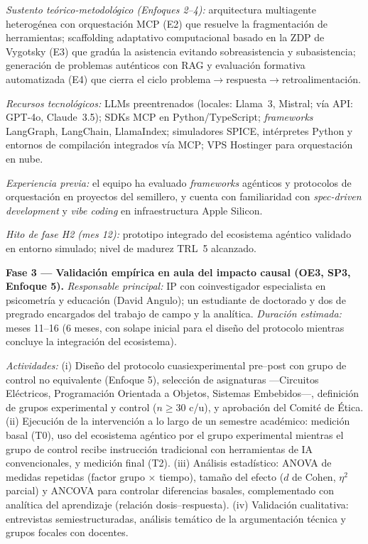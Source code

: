 \emph{Sustento teórico-metodológico (Enfoques 2--4):} arquitectura multiagente
heterogénea con orquestación MCP (E2) que resuelve la fragmentación de
herramientas; scaffolding adaptativo computacional basado en la ZDP de
Vygotsky (E3) que gradúa la asistencia evitando sobreasistencia y subasistencia;
generación de problemas auténticos con RAG y evaluación formativa automatizada
(E4) que cierra el ciclo problema$\to$respuesta$\to$retroalimentación.

\emph{Recursos tecnológicos:} LLMs preentrenados (locales: Llama~3, Mistral;
vía API: GPT-4o, Claude~3.5); SDKs MCP en Python/TypeScript; \emph{frameworks}
LangGraph, LangChain, LlamaIndex; simuladores SPICE, intérpretes Python y
entornos de compilación integrados vía MCP; VPS Hostinger para orquestación en
nube.

\emph{Experiencia previa:} el equipo ha evaluado \emph{frameworks} agénticos y
protocolos de orquestación en proyectos del semillero, y cuenta con
familiaridad con \emph{spec-driven development} y \emph{vibe coding} en
infraestructura Apple Silicon.

\emph{Hito de fase H2 (mes 12):} prototipo integrado del ecosistema agéntico
validado en entorno simulado; nivel de madurez TRL~5 alcanzado.

\medskip

\noindent\textbf{Fase 3 — Validación empírica en aula del impacto causal
(OE3, SP3, Enfoque 5).}
\emph{Responsable principal:} IP con coinvestigador especialista en psicometría
y educación (David Angulo); un estudiante de doctorado y dos de pregrado
encargados del trabajo de campo y la analítica. \emph{Duración estimada:} meses
11--16 (6 meses, con solape inicial para el diseño del protocolo mientras
concluye la integración del ecosistema).

\emph{Actividades:} (i) Diseño del protocolo cuasiexperimental pre--post con
grupo de control no equivalente (Enfoque 5), selección de asignaturas
—Circuitos Eléctricos, Programación Orientada a Objetos, Sistemas Embebidos—,
definición de grupos experimental y control ($n \geq 30$ c/u), y aprobación del
Comité de Ética. (ii) Ejecución de la intervención a lo largo de un semestre
académico: medición basal (T0), uso del ecosistema agéntico por el grupo
experimental mientras el grupo de control recibe instrucción tradicional con
herramientas de IA convencionales, y medición final (T2). (iii) Análisis
estadístico: ANOVA de medidas repetidas (factor grupo $\times$ tiempo), tamaño
del efecto ($d$ de Cohen, $\eta^2$ parcial) y ANCOVA para controlar diferencias
basales, complementado con analítica del aprendizaje (relación
dosis--respuesta). (iv) Validación cualitativa: entrevistas semiestructuradas,
análisis temático de la argumentación técnica y grupos focales con docentes.

